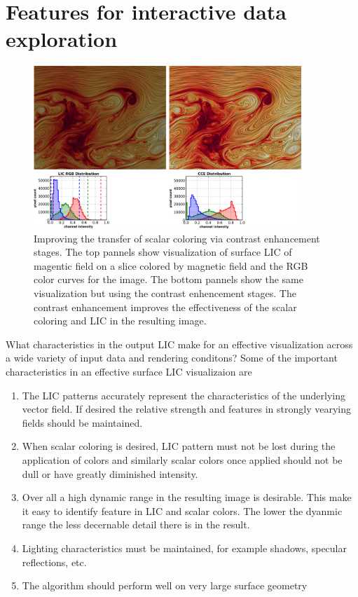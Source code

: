 \documentclass[a4paper,10pt]{article}
\begin{document}
\section{Features for interactive data exploration}
\begin{figure}[ht!]
 \centering
 \includegraphics[width=0.9\textwidth]{./images-data/dia-serial/color-ce-curves-khB-both-h.png}
 \caption{Improving the transfer of scalar coloring via contrast enhancement stages. The top pannels show visualization of surface LIC of magentic field on a slice colored by magnetic field and the RGB color curves for the image. The bottom pannels show the same visualization but using the contrast enhencement stages. The contrast enhancement improves the effectiveness of the scalar coloring and LIC in the resulting image.}
 \label{fig:cce-khb}
\end{figure}
What characteristics in the output LIC make for an effective visualization across a wide variety of input data and rendering conditons? Some of the important characteristics in an effective surface LIC visualizaion are
\begin{enumerate}
 \item The LIC patterns accurately represent the characteristics of the underlying vector field. If desired the relative strength and features in strongly vearying fields should be maintained.
 \item When scalar coloring is desired, LIC pattern must not be lost during the application of colors and similarly scalar colors once applied should not be dull or have greatly diminished intensity.
 \item Over all a high dynamic range in the resulting image is desirable. This make it easy to identify feature in LIC and scalar colors. The lower the dyanmic range the less decernable detail there is in the result.
 \item Lighting characteristics must be maintained, for example shadows, specular reflections, etc.
 \item The algorithm should perform well on very large surface geometry
\end{enumerate}
\end{document}
